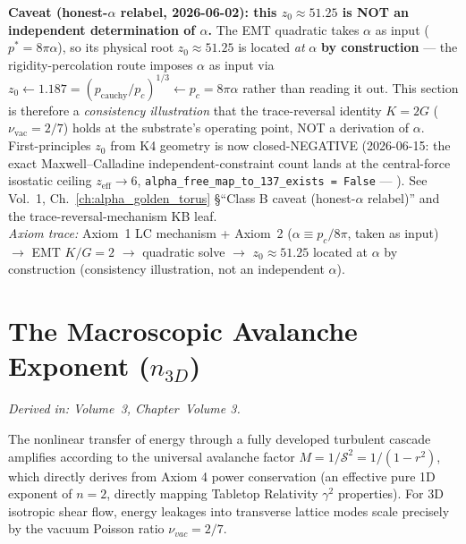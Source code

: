 \textbf{Caveat (honest-$\alpha$ relabel, 2026-06-02): this $z_0 \approx 51.25$ is NOT an independent determination of $\alpha$.} The EMT quadratic takes $\alpha$ as input ($p^* = 8\pi\alpha$), so its physical root $z_0 \approx 51.25$ is located \emph{at} $\alpha$ \textbf{by construction} --- the rigidity-percolation route imposes $\alpha$ as input via $z_0 \leftarrow 1.187 = (p_{\text{cauchy}}/p_c)^{1/3} \leftarrow p_c = 8\pi\alpha$ rather than reading it out. This section is therefore a \emph{consistency illustration} that the trace-reversal identity $K = 2G$ ($\nu_{\text{vac}} = 2/7$) holds at the substrate's operating point, NOT a derivation of $\alpha$. First-principles $z_0$ from K4 geometry is now closed-NEGATIVE (2026-06-15: the exact Maxwell--Calladine independent-constraint count lands at the central-force isostatic ceiling $z_{\text{eff}} \to 6$, \texttt{alpha\_free\_map\_to\_137\_exists = False} --- ). %
See Vol.~1, Ch.~\ref{ch:alpha_golden_torus} \S``Class B caveat (honest-$\alpha$ relabel)'' and the trace-reversal-mechanism KB leaf. \\
\textit{Axiom trace:} Axiom~1 LC mechanism + Axiom~2 ($\alpha \equiv p_c/8\pi$, taken as input) $\rightarrow$ EMT $K/G = 2$ $\rightarrow$ quadratic solve $\rightarrow$ $z_0 \approx 51.25$ located at $\alpha$ by construction (consistency illustration, not an independent $\alpha$).

\section{The Macroscopic Avalanche Exponent ($n_{3D}$)}
\label{app:avalanche_n_3d}
\textit{Derived in: Volume~3, Chapter~Volume 3.}

The nonlinear transfer of energy through a fully developed turbulent cascade amplifies according to the universal avalanche factor $M = 1/\mathcal{S}^2 = 1/(1-r^2)$, which directly derives from Axiom 4 power conservation (an effective pure 1D exponent of $n=2$, directly mapping Tabletop Relativity $\gamma^2$ properties). For 3D isotropic shear flow, energy leakages into transverse lattice modes scale precisely by the vacuum Poisson ratio $\nu_{vac} = 2/7$.

